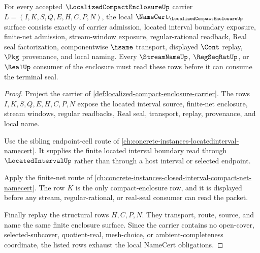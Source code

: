 \begin{theorem}
\label{thm:localized-compact-enclosure-namecert-obligations}
For every accepted $\LocalizedCompactEnclosureUp$ carrier
$L=(I,K,S,Q,E,H,C,P,N)$, the local
$\NameCert_{\LocalizedCompactEnclosureUp}$ surface consists exactly of carrier admission, located interval boundary exposure, finite-net admission, stream-window exposure, regular-rational readback, Real seal factorization, componentwise $\hsame$ transport, displayed $\Cont$ replay, $\Pkg$ provenance, and local naming. Every $\StreamNameUp$, $\RegSeqRatUp$, or $\RealUp$ consumer of the enclosure must read these rows before it can consume the terminal seal.
\end{theorem}
\begin{proof}
Project the carrier of \autoref{def:localized-compact-enclosure-carrier}. The rows $I,K,S,Q,E,H,C,P,N$ expose the located interval source, finite-net enclosure, stream windows, regular readbacks, Real seal, transport, replay, provenance, and local name.

Use the sibling endpoint-cell route of \autoref{ch:concrete-instances-locatedinterval-namecert}. It supplies the finite located interval boundary read through $\LocatedIntervalUp$ rather than through a host interval or selected endpoint.

Apply the finite-net route of \autoref{ch:concrete-instances-closed-interval-compact-net-namecert}. The row $K$ is the only compact-enclosure row, and it is displayed before any stream, regular-rational, or real-seal consumer can read the packet.

Finally replay the structural rows $H,C,P,N$. They transport, route, source, and name the same finite enclosure surface. Since the carrier contains no open-cover, selected-subcover, quotient-real, mesh-choice, or ambient-completeness coordinate, the listed rows exhaust the local NameCert obligations.
\end{proof}

